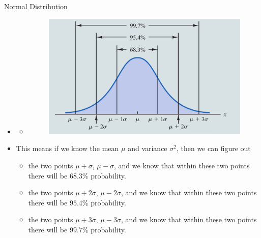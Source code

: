 \documentclass[8pt, usepdftitle=false]{beamer}
\begin{document}
\begin{frame}[allowframebreaks]{Normal Distribution}
\begin{itemize}
\begin{itemize}
\item Notice the figure the Mean (or expected value) will be always at the center of the Normal distribution. 

\item Then you should remember following picture (this is taken from \cite{anderson_statistics_2020})
\medskip

\end{itemize}

\item[]

\begin{itemize}
\item[]

\begin{figure}
\centering
\includegraphics[scale = .25]{Images/PDF_Normal_percentiles.png}

\end{figure}
\end{itemize}

\item This means if we know the mean $\mu$ and variance $\sigma^2$, then we can figure out 

\begin{itemize}
\item   the two points $\mu + \sigma$,  $\mu - \sigma$, and we know that within these two points there will be $68.3\%$ probability. 
\item   the two points $\mu + 2\sigma$,  $\mu - 2\sigma$, and we know that within these two points there will be $95.4\%$ probability. 
\item   the two points $\mu + 3\sigma$,  $\mu - 3\sigma$, and we know that within these two points there will be $99.7\%$ probability. 

\end{itemize}




\end{itemize}
\end{frame}
\end{document}
